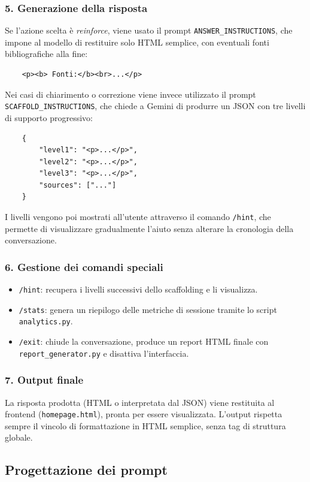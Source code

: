 \documentclass[a4paper,9pt]{article}
\begin{document}
\subsubsection{5. Generazione della risposta }
Se l'azione scelta è \textit{reinforce}, viene usato il prompt \texttt{ANSWER\_INSTRUCTIONS}, che impone al modello di restituire solo HTML semplice, con eventuali fonti bibliografiche alla fine:
\begin{verbatim}
	<p><b> Fonti:</b><br>...</p>
\end{verbatim}

Nei casi di chiarimento o correzione viene invece utilizzato il prompt \texttt{SCAFFOLD\_INSTRUCTIONS}, che chiede a Gemini di produrre un JSON con tre livelli di supporto progressivo:
\begin{verbatim}
	{
		"level1": "<p>...</p>",
		"level2": "<p>...</p>",
		"level3": "<p>...</p>",
		"sources": ["..."]
	}
\end{verbatim}

I livelli vengono poi mostrati all'utente attraverso il comando \texttt{/hint}, che permette di visualizzare gradualmente l'aiuto senza alterare la cronologia della conversazione.

\subsubsection{6. Gestione dei comandi speciali}
\begin{itemize}
	\item \texttt{/hint}: recupera i livelli successivi dello scaffolding e li visualizza.
	\item \texttt{/stats}: genera un riepilogo delle metriche di sessione tramite lo script \texttt{analytics.py}.
	\item \texttt{/exit}: chiude la conversazione, produce un report HTML finale con \texttt{report\_generator.py} e disattiva l'interfaccia.
\end{itemize}

\subsubsection{7. Output finale}
La risposta prodotta (HTML o interpretata dal JSON) viene restituita al frontend (\texttt{homepage.html}), pronta per essere visualizzata. 
L'output rispetta sempre il vincolo di formattazione in HTML semplice, senza tag di struttura globale.

\subsection{Progettazione dei prompt}
\end{document}
